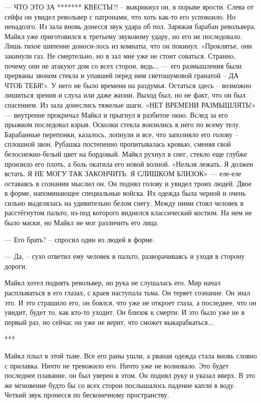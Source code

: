 — ЧТО ЭТО ЗА ******* КВЕСТЫ?! – выкрикнул он, в порыве ярости. Слева от сейфа он увидел револьвер с патронами, что хоть как-то его успокоило. Но ненадолго. Из зала вновь донесся звук удара об пол. Заряжая барабан револьвера, Майкл уже приготовился к третьему звуковому удару, но его не последовало. Лишь тихое шипение доноси-лось из комнаты, что он покинул. «Проклятье, они закинули газ. Не смертельно, но в зал мне уже не стоит соваться. Странно, почему они не атакуют дом со всех сторон, ведь... — его размышления были прерваны звоном стекла и упавшей перед ним светошумовой гранатой – ДА ЧТОБ ТЕБЯ!». У него не было времени на раздумья. Остаться здесь – возможно лишиться зрения и слуха или даже жизни. Выход был, но не факт, что он был спасением. Из зала донеслись тяжелые шаги. «НЕТ ВРЕМЕНИ РАЗМЫШЛЯТЬ!» — внутренне прокричал Майкл и прыгнул в разбитое окно. Вслед за его прыжком последовал взрыв. Осколки стекла вонзились в него по всему телу. Барабанные перепонки, казалось, лопнули и все, что заполняло его голову – сплошной звон. Рубашка постепенно пропитывалась кровью, сменяя свой белоснежно-белый цвет на бордовый. Майкл рухнул в снег, стекло еще глубже пронзило его плоть, а боль окатила его новой волной. «Нельзя лежать. Я должен встать. Я НЕ МОГУ ТАК ЗАКОНЧИТЬ. Я СЛИШКОМ БЛИЗОК» — еле-еле оставаясь в сознании мыслил он. Он поднял голову и увидел троих людей. Двое в форме, напоминающее специальные войска. Их одежда была черной и очень сильно выделялась на удивительно белом снегу. Между ними стоял человек в расстёгнутом пальто, из-под которого виднелся классический костюм. На нем не было маски, но Майкл не мог различить его лица.

— Его брать? – спросил один из людей в форме.

— Да, – сухо ответил ему человек в пальто, разворачиваясь и уходя в сторону дороги. 

Майкл хотел поднять револьвер, но рука не слушалась его. Мир начал расплываться в его глазах, с краев наступала тьма. Он теряет сознание. Он знал это. И это страшило его, он боялся, что уже не откроет глаза, а последнее, что он увидит, будет то, как кто-то уходит. Он близок к смерти. И это было уже не в первый раз, но сейчас он уже не верит, что сможет выкарабкаться...

\begin{center}***\end{center}

Майкл плыл в этой тьме. Все его раны ушли, а рваная одежда стала вновь словно с прилавка. Ничто не тревожило его. Ничто уже не волновало. Это будет последнее плавание, он был уверен в этом. Он поднял руку и указал вверх. В это же мгновение будто бы со всех сторон послышалось падение капли в воду. Четкий звук пронесся по бесконечному пространству.

